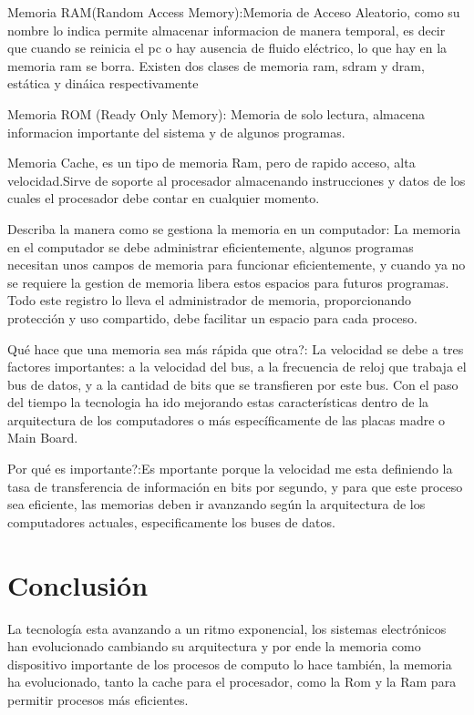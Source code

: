 \documentclass{article}
\begin{document}
Memoria RAM(Random Access Memory):Memoria de Acceso Aleatorio, como su nombre lo indica permite almacenar informacion de manera temporal, es decir que cuando se reinicia el pc o hay ausencia de fluido eléctrico, lo que hay en la memoria ram se borra. 
Existen dos clases de memoria ram, sdram y dram, estática y dináica respectivamente

Memoria ROM (Ready Only Memory): Memoria de solo lectura, almacena informacion importante del sistema y de algunos programas.

Memoria Cache, es un tipo de memoria Ram, pero de rapido acceso, alta velocidad.Sirve de soporte al procesador almacenando instrucciones y datos de los cuales el procesador debe contar en cualquier momento. 

Describa la manera como se gestiona la memoria en un computador:
La memoria en el computador se debe administrar eficientemente, algunos programas necesitan unos campos de memoria para funcionar eficientemente, y cuando ya no se requiere la gestion de memoria libera estos espacios para futuros programas.
Todo este registro lo lleva el administrador de memoria, proporcionando protección y uso compartido, debe facilitar un espacio para cada proceso.

Qué hace que una memoria sea más rápida que otra?:
La velocidad se debe a tres factores importantes: a la velocidad del bus, a la frecuencia de reloj que trabaja el bus de datos, y a la cantidad de bits que se transfieren por este bus. Con el paso del tiempo la tecnologia ha ido mejorando estas características dentro de la arquitectura de los computadores o más específicamente de las placas madre o Main Board.

Por qué es importante?:Es mportante porque la velocidad me esta definiendo la tasa de transferencia de información en bits por segundo, y para que este proceso sea eficiente, las memorias deben ir avanzando según la arquitectura de los computadores actuales, especificamente los buses de datos.



\section{Conclusión} \label{conclulsion}

La tecnología esta avanzando a un ritmo exponencial, los sistemas electrónicos han evolucionado cambiando su arquitectura y por ende la memoria como dispositivo importante de los procesos de computo lo hace también, la memoria ha evolucionado, tanto la cache para el procesador, como la Rom y la Ram para permitir procesos más eficientes.



\end{document}
